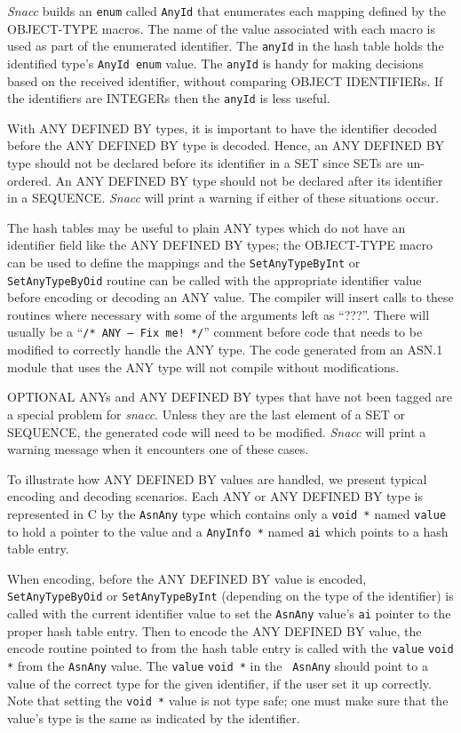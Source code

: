 {\em Snacc} builds an {\tt enum} called {\tt AnyId} that enumerates
each mapping defined by the OBJECT-TYPE macros.  The name of the value
associated with each macro is used as part of the enumerated
identifier.  The {\tt anyId} in the hash table holds the identified
type's {\tt AnyId enum} value.  The {\tt anyId} is handy for making
decisions based on the received identifier, without comparing OBJECT
IDENTIFIERs.  If the identifiers are INTEGERs then the {\tt anyId} is
less useful.

With ANY DEFINED BY types, it is important to have the identifier
decoded before the ANY DEFINED BY type is decoded.  Hence, an ANY
DEFINED BY type should not be declared before its identifier in a SET
since SETs are un-ordered. An ANY DEFINED BY type should not be
declared after its identifier in a SEQUENCE\@. {\em Snacc} will print a
warning if either of these situations occur.

The hash tables may be useful to plain ANY types which do not have an
identifier field like the ANY DEFINED BY types; the OBJECT-TYPE macro
can be used to define the mappings and the {\tt SetAnyTypeByInt} or
{\tt SetAnyTypeByOid} routine can be called with the appropriate
identifier value before encoding or decoding an ANY value.  The
compiler will insert calls to these routines where necessary with some
of the arguments left as ``???''.  There will usually be a ``{\tt /*
ANY -- Fix me! */}'' comment before code that needs to be modified to
correctly handle the ANY type.  The code generated from an ASN.1
module that uses the ANY type will not compile without modifications.

OPTIONAL ANYs and ANY DEFINED BY types that have not been tagged are a
special problem for {\em snacc}.  Unless they are the last element of a SET
or SEQUENCE, the generated code will need to be modified.  {\em Snacc} will
print a warning message when it encounters one of these cases.

To illustrate how ANY DEFINED BY values are handled, we present
typical encoding and decoding scenarios. Each ANY or ANY DEFINED BY
type is represented in C by the {\tt AsnAny} type which contains only
a {\tt void *} named {\tt value} to hold a pointer to the value and a
{\tt AnyInfo *} named {\tt ai} which points to a hash table entry.

When encoding, before the ANY DEFINED BY value is encoded, {\tt
SetAnyTypeByOid} or {\tt SetAnyTypeByInt} (depending on the type of
the identifier) is called with the current identifier value to set the
{\tt AsnAny} value's {\tt ai} pointer to the proper hash table entry.
Then to encode the ANY DEFINED BY value, the encode routine pointed to
from the hash table entry is called with the {\tt value} {\tt void *}
from the {\tt AsnAny} value.  The {\tt value} {\tt void *} in the {\tt
AsnAny} should point to a value of the correct type for the given
identifier, if the user set it up correctly.  Note that setting the
{\tt void *} value is not type safe; one must make sure that the
value's type is the same as indicated by the identifier.

